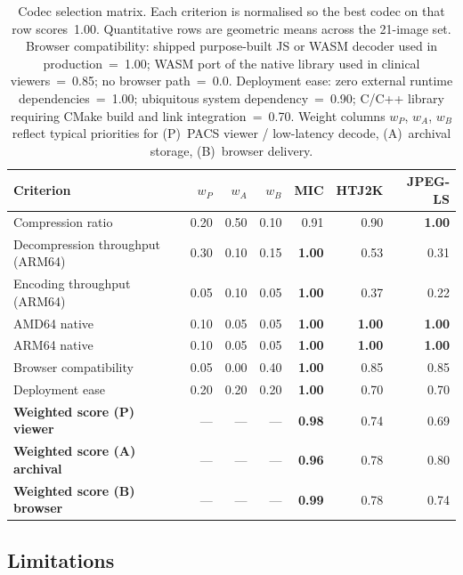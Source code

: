 \documentclass[11pt]{article}
\begin{document}
\begin{table}[htbp]
\centering
\caption{Codec selection matrix. Each criterion is normalised so the
best codec on that row scores~1.00. Quantitative rows are geometric
means across the 21-image set. Browser compatibility: shipped
purpose-built JS or WASM decoder used in production~=~1.00; WASM port of
the native library used in clinical viewers~=~0.85; no browser
path~=~0.0. Deployment ease: zero external runtime dependencies~=~1.00;
ubiquitous system dependency~=~0.90; C/C++ library requiring CMake build
and link integration~=~0.70. Weight columns $w_P$, $w_A$, $w_B$ reflect
typical priorities for (P)~PACS viewer / low-latency decode, (A)~archival
storage, (B)~browser delivery.}
\label{tab:decision-matrix}
\footnotesize
\setlength{\tabcolsep}{4pt}
\begin{tabular}{lrrrrrr}
\toprule
Criterion & $w_P$ & $w_A$ & $w_B$ & MIC & HTJ2K & JPEG-LS \\
\midrule
Compression ratio                & 0.20 & 0.50 & 0.10 & 0.91 & 0.90 & \textbf{1.00} \\
Decompression throughput (ARM64) & 0.30 & 0.10 & 0.15 & \textbf{1.00} & 0.53 & 0.31 \\
Encoding throughput (ARM64)      & 0.05 & 0.10 & 0.05 & \textbf{1.00} & 0.37 & 0.22 \\
AMD64 native                     & 0.10 & 0.05 & 0.05 & \textbf{1.00} & \textbf{1.00} & \textbf{1.00} \\
ARM64 native                     & 0.10 & 0.05 & 0.05 & \textbf{1.00} & \textbf{1.00} & \textbf{1.00} \\
Browser compatibility            & 0.05 & 0.00 & 0.40 & \textbf{1.00} & 0.85 & 0.85 \\
Deployment ease                  & 0.20 & 0.20 & 0.20 & \textbf{1.00} & 0.70 & 0.70 \\
\midrule
\textbf{Weighted score (P) viewer}   & --- & --- & --- & \textbf{0.98} & 0.74 & 0.69 \\
\textbf{Weighted score (A) archival} & --- & --- & --- & \textbf{0.96} & 0.78 & 0.80 \\
\textbf{Weighted score (B) browser}  & --- & --- & --- & \textbf{0.99} & 0.78 & 0.74 \\
\bottomrule
\end{tabular}
\end{table}

\subsection{Limitations}
\end{document}
